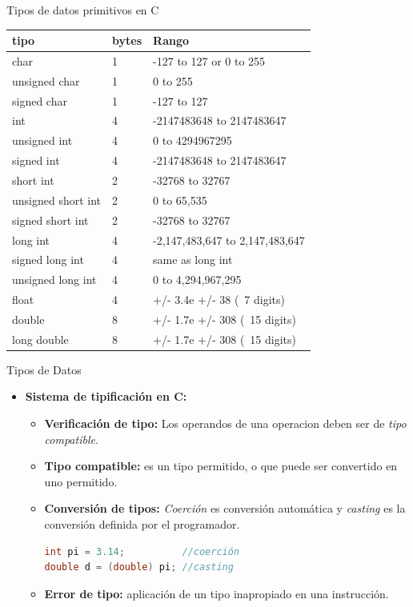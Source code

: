 \documentclass{beamer}
\begin{document}
\begin{frame}[fragile]{Tipos de datos primitivos en C}
\vspace{-.25cm}
\begin{center}
	\small
	\begin{tabular}{|l|l|l|}\hline \hline
		tipo & bytes & Rango\\ \hline 
		char & 1 & -127 to 127 or 0 to 255\\ \hline 
		unsigned char & 1 & 0 to 255\\ \hline 
		signed char & 1 & -127 to 127\\ \hline 
		int & 4 & -2147483648 to 2147483647\\ \hline 
		unsigned int & 4 & 0 to 4294967295\\ \hline 
		signed int & 4 & -2147483648 to 2147483647\\ \hline 
		short int & 2 & -32768 to 32767\\ \hline 
		unsigned short int & 2 & 0 to 65,535\\ \hline 
		signed short int & 2 & -32768 to 32767\\ \hline 
		long int & 4 & -2,147,483,647 to 2,147,483,647\\ \hline 
		signed long int & 4 & same as long int\\ \hline 
		unsigned long int & 4 & 0 to 4,294,967,295\\ \hline 
		float & 4 & +/- 3.4e +/- 38 (~7 digits)\\ \hline 
		double & 8  & +/- 1.7e +/- 308 (~15 digits)\\ \hline 
		long double & 8  & +/- 1.7e +/- 308 (~15 digits)\\ \hline 
	\end{tabular}
\end{center}
\end{frame}

\begin{frame}[fragile]{Tipos de Datos}
\begin{itemize}
	\item \textbf{Sistema de tipificación en C:}
	\begin{itemize}
		\item \textbf{Verificación de tipo:} Los operandos de una operacion deben ser de \emph{tipo compatible}.
		\item \textbf{Tipo compatible:} es un tipo permitido, o que puede ser convertido en uno permitido.
		\item \textbf{Conversión de tipos:} \emph{Coerción} es conversión automática y \emph{casting} es la conversión definida por el programador.
		\begin{lstlisting}[language=C]
int pi = 3.14;          //coerción
double d = (double) pi; //casting       
		\end{lstlisting}
		\item \textbf{Error de tipo:} aplicación de un tipo inapropiado en una instrucción.
	\end{itemize}
\end{itemize}
\end{frame}
\end{document}
